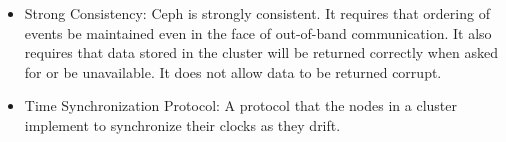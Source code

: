 \begin{itemize}
\item Strong Consistency: Ceph is strongly consistent. It requires
  that ordering of events be maintained even in the face of
  out-of-band communication. It also requires that data stored in the
  cluster will be returned correctly when asked for or be
  unavailable. It does not allow data to be returned corrupt.

\item Time Synchronization Protocol: A protocol that the nodes in a
  cluster implement to synchronize their clocks as they drift.


  
\end{itemize}

